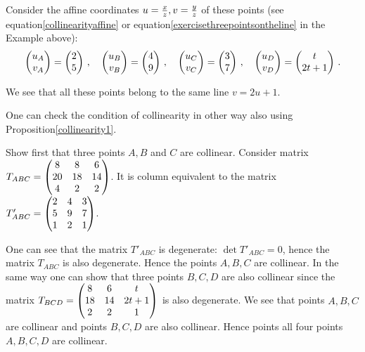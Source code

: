 \documentclass[12pt]{article}
\numberwithin{equation}{section}
\begin{document}
  Consider the affine coordinates $u={x\over z}, v={y\over z}$ 
of these points
(see equation\eqref{collinearityaffine} or  
equation\eqref{exercisethreepointsontheline} in the Example above):
                   \begin{equation}\label{secondexampleofcrossratio}
\begin{pmatrix}
    u_A\cr
    v_A\cr
\end{pmatrix}
    =
\begin{pmatrix}
    2\cr
    5\cr
\end{pmatrix}
   \,,
    \quad
\begin{pmatrix}
    u_B\cr
    v_B\cr
\end{pmatrix}
    =
\begin{pmatrix}
    4\cr
    9\cr
\end{pmatrix}
   \,,
    \quad
\begin{pmatrix}
    u_C\cr
    v_C\cr
\end{pmatrix}
    =
\begin{pmatrix}
    3\cr
    7\cr
\end{pmatrix}
   \,,
    \quad
\begin{pmatrix}
    u_D\cr
    v_D\cr
\end{pmatrix}
    =
\begin{pmatrix}
    t\cr
    2t+1\cr
\end{pmatrix}
  \,.
                   \end{equation}

We see that all these points belong to the same line
  $v=2u+1$.

\m

One can check the condition of collinearity in other way
also using  Proposition\ref{collinearity1}.

Show first that three points $A,B$ and $C$ are collinear.
Consider matrix
   $T_{ABC}=\begin{pmatrix} 
          8 & 8 & 6\cr
          20& 18 & 14\cr
          4 & 2 & 2\cr
          \end{pmatrix}
$. It is column equivalent to the matrix
$T'_{ABC}=\begin{pmatrix} 
          2 & 4 & 3\cr
          5  & 9 & 7\cr
          1 & 2 & 1\cr
          \end{pmatrix}$.

One can see that the matrix $T'_{ABC}$  is degenerate:
$\det T'_{ABC}=0$, hence the matrix $T_{ABC}$ is also degenerate.
 Hence the  points
$A,B,C$ are collinear.
In the same way one can show that three points $B,C,D$
are also collinear since 
the  matrix
   $T_{BCD}=\begin{pmatrix} 
          8 & 6 & t\cr
          18& 14 & 2t+1\cr
          2 & 2 & 1\cr
          \end{pmatrix}
$ is also degenerate.
We see that points $A,B,C$ are collinear and points
$B,C,D$ are also collinear. Hence points all four points
$A,B,C,D$ are collinear.
\end{document}
